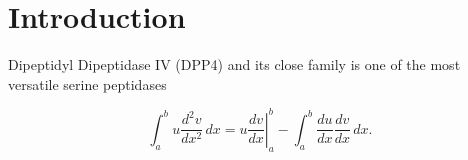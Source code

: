 \section{Introduction}
\label{intro} 

Dipeptidyl Dipeptidase IV (DPP4) and its close family is one of the most versatile serine peptidases  

\begin{equation}
\label{eqn:drag}
	\int_a^bu\frac{d^2v}{dx^2}\,dx
	=\left.u\frac{dv}{dx}\right|_a^b
	-\int_a^b\frac{du}{dx}\frac{dv}{dx}\,dx.
\end{equation}
